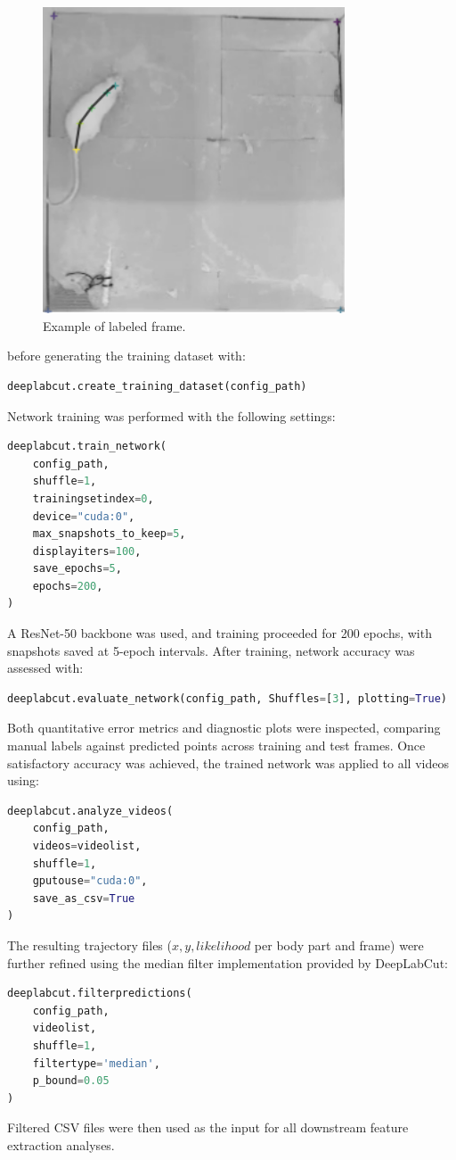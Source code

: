 \begin{figure}[htbp]
    \centering
    \includegraphics[width=0.8\textwidth]{Figures/label_frames_ex.png}
    \caption{Example of labeled frame.}
    \label{fig:myfigure}
\end{figure}

before generating the training dataset with:
\begin{lstlisting}[language=Python]
deeplabcut.create_training_dataset(config_path)
\end{lstlisting}
Network training was performed with the following settings:
\begin{lstlisting}[language=Python]
deeplabcut.train_network(
    config_path,
    shuffle=1,
    trainingsetindex=0,
    device="cuda:0",
    max_snapshots_to_keep=5,
    displayiters=100,
    save_epochs=5,
    epochs=200,
)
\end{lstlisting}
A ResNet-50 backbone was used, and training proceeded for 200 epochs, with snapshots saved at 5-epoch intervals. 
After training, network accuracy was assessed with:
\begin{lstlisting}[language=Python]
deeplabcut.evaluate_network(config_path, Shuffles=[3], plotting=True)
\end{lstlisting}
Both quantitative error metrics and diagnostic plots were inspected, comparing manual labels against predicted points across training and test frames. Once satisfactory accuracy was achieved, the trained network was applied to all videos using:
\begin{lstlisting}[language=Python]
deeplabcut.analyze_videos(
    config_path,
    videos=videolist,
    shuffle=1,
    gputouse="cuda:0",
    save_as_csv=True
)
\end{lstlisting}
The resulting trajectory files ($x, y, likelihood$ per body part and frame) were further refined using the median filter implementation provided by DeepLabCut:
\begin{lstlisting}[language=Python]
deeplabcut.filterpredictions(
    config_path,
    videolist,
    shuffle=1,
    filtertype='median',
    p_bound=0.05
)
\end{lstlisting}
Filtered CSV files were then used as the input for all downstream feature extraction analyses.


